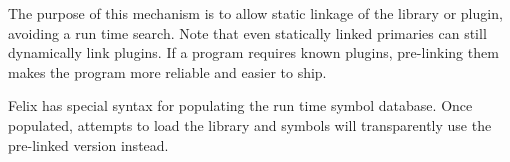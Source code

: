 \documentclass[oneside]{book}
\begin{document}
The purpose of this mechanism is to allow static linkage of
the library or plugin, avoiding a run time search.
Note that even statically linked primaries can still dynamically
link plugins. If a program requires known plugins, pre-linking
them makes the program more reliable and easier to ship.

Felix has special syntax for populating the run time symbol
database. Once populated, attempts to load the library and symbols
will transparently use the pre-linked version instead.
\clearpage
{}
{}
\listoflistings
%
\clearpage
{}
\printindex[codeindex] 
%
\clearpage
{}
\printindex
%
\end{document}
